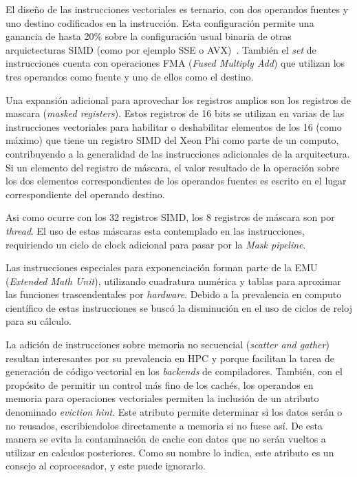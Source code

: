 El dise\~no de las instrucciones vectoriales es ternario, con dos operandos fuentes y uno destino codificados en la instrucci\'on.
Esta configuraci\'on permite una ganancia de hasta 20\% sobre la configuraci\'on usual binaria de otras arquictecturas SIMD (como
por ejemplo SSE o AVX)~\cite{BookXeonPhi}. Tambi\'en el \textit{set} de instrucciones cuenta con operaciones FMA (\textit{Fused
Multiply Add}) que utilizan los tres operandos como fuente y uno de ellos como el destino.

Una expansi\'on adicional para aprovechar los registros amplios son los registros de mascara (\textit{masked registers}).
Estos registros de 16 bits se utilizan en varias de las instrucciones vectoriales para habilitar o deshabilitar elementos
de los 16 (como m\'aximo) que tiene un registro SIMD del Xeon Phi como parte de un computo, contribuyendo a la generalidad de
las instrucciones adicionales de la arquitectura. Si un elemento del registro de m\'ascara, el valor resultado de la operaci\'on
sobre los dos elementos correspondientes de los operandos fuentes es escrito en el lugar correspondiente del operando destino.

Asi como ocurre con los 32 registros SIMD, los 8 registros de m\'ascara son
por \textit{thread}. El uso de estas m\'ascaras esta contemplado en las instrucciones, requiriendo un ciclo de clock adicional
para pasar por la \textit{Mask pipeline}. 

Las instrucciones especiales para exponenciaci\'on forman parte de la EMU (\textit{Extended Math Unit}), utilizando cuadratura
num\'erica y tablas para aproximar las funciones trascendentales por \textit{hardware}. Debido a la prevalencia en computo
cient\'ifico de estas instrucciones se busc\'o la disminuci\'on en el uso de ciclos de reloj para su c\'alculo.

La adici\'on de instrucciones sobre memoria no secuencial (\textit{scatter and gather}) resultan interesantes por su prevalencia
en HPC y porque facilitan la tarea de generaci\'on de c\'odigo vectorial en los \textit{backends} de compiladores. Tambi\'en, con
el prop\'osito de permitir un control m\'as fino de los cach\'es, los operandos en memoria para operaciones vectoriales permiten
la inclusi\'on de un atributo denominado \textit{eviction hint}. Este atributo permite determinar si los datos ser\'an o no
reusados, escribiendolos directamente a memoria si no fuese as\'i. De esta manera se evita la contaminaci\'on de cache con datos
que no ser\'an vueltos a utilizar en calculos posteriores. Como su nombre lo indica, este atributo es un consejo al coprocesador,
y este puede ignorarlo.

